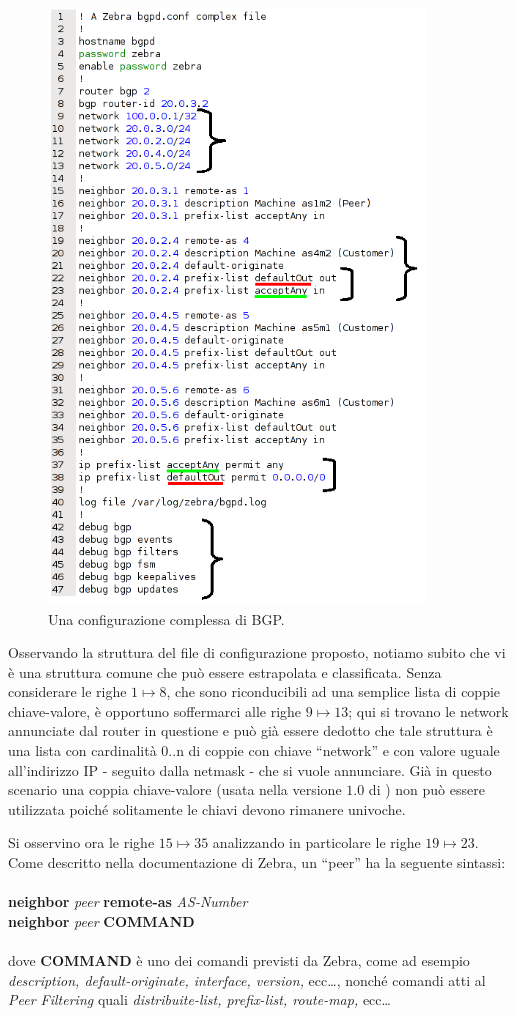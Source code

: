 \begin{figure}[!htb]
	\centering
	\includegraphics[width=10cm]{images/bgp_conf_schema.png}
	\caption{Una configurazione complessa di BGP.}
	\label{figura:bgp_conf_schema}
\end{figure}

Osservando la struttura del file di configurazione proposto, notiamo subito che vi è una struttura comune che può essere estrapolata e classificata. Senza considerare le righe $1\mapsto8$, che sono riconducibili ad una semplice lista di coppie chiave-valore, è opportuno soffermarci alle righe $9\mapsto13$; qui si trovano le network annunciate dal router in questione e può già essere dedotto che tale struttura è una lista con cardinalità 0..n di coppie con chiave ``network'' e con valore uguale all'indirizzo IP - seguito dalla netmask - che si vuole annunciare. Già in questo scenario una coppia chiave-valore (usata nella versione $1.0$ di \visualnetkit{}) non può essere utilizzata poiché solitamente le chiavi devono rimanere univoche.

Si osservino ora le righe $15\mapsto35$ analizzando in particolare le righe $19\mapsto23$. Come descritto nella documentazione di Zebra\cite{ZEBRADOC}, un ``peer'' ha la seguente sintassi:
\\
\\
\textbf{neighbor} \textit{peer} \textbf{remote-as} \textit{AS-Number}
\\
\textbf{neighbor} \textit{peer} \textbf{COMMAND}
\\
\\
dove \textbf{COMMAND} è uno dei comandi previsti da Zebra, come ad esempio \emph{description, default-originate, interface, version,} ecc\ldots, nonché comandi atti al \emph{Peer Filtering} quali \emph{distribuite-list, prefix-list, route-map,} ecc\ldots

